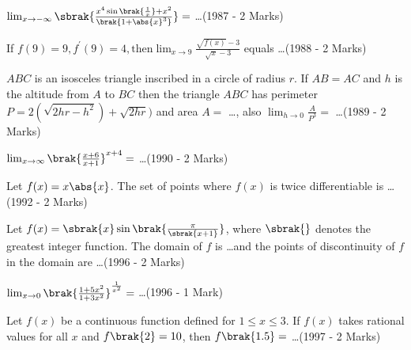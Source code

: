 \item {
    $\lim_{x\to-\infty}\sbrak{\frac{x^4 \sin \brak{\frac{1}{x}} + x^2}{\brak{1 + \abs{x}^3}}} =$ \ldots \hfill (1987 - 2 Marks)
}\\

\item {
    If $f(9)=9, f^{\prime}(9)=4, \text{then} \lim_{x\to9}\frac{\sqrt{f(x)}-3 }{\sqrt{x}-3}$ equals \ldots \hfill (1988 - 2 Marks)
}\\

\item{
    $ABC$ is an isosceles triangle inscribed in a circle of radius $r$. If $AB = AC$ and $h$ is the altitude from $A$ to $BC$ then the triangle $ABC$ has perimeter $P=2(\sqrt{2hr-h^2})+\sqrt{2hr})$ and area $A=$ \ldots , also $\lim_{h\to0} \frac{A}{P^3} = $ \ldots \hfill (1989 - 2 Marks)
}\\

\item {
    $\lim_{x\to\infty}\brak{\frac{x+6}{x +1}}^{x+4} =$ \ldots \hfill (1990 - 2 Marks)
}\\

\item{
    Let $f(x) = x\abs{x}$. The set of points where $f(x)$ is twice differentiable is \ldots \hfill (1992 - 2 Marks)
}\\

\item{
    Let $f(x)= \sbrak{x} \sin\brak{\frac{\pi}{\sbrak{x+1}}}$, where $\sbrak{}$ denotes the greatest integer function. The domain of $f$ is \ldots and the points of discontinuity of $f$ in the domain are \ldots \hfill (1996 - 2 Marks)
}\\

\item{
    $\lim_{x\to0} \brak{\frac{1+5x^2}{1+3x^2}}^{\frac{1}{x^2}} =$ \ldots \hfill (1996 - 1 Mark)
}\\

\item{
    Let $f(x)$ be a continuous function defined for $1 \leq x \leq 3$. If $f(x)$ takes rational values for all $x$ and $f\brak{2} = 10$, then $f\brak{1.5} = $ \ldots \hfill (1997 - 2 Marks)
}\\
